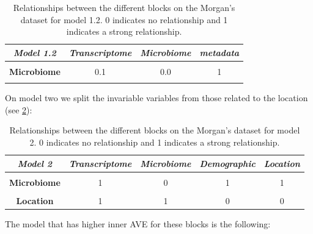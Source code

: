 \documentclass[
  12pt,
  a4paper,
  twoside,
  openright]{book}
\begin{document}
\begin{table}[H]

\caption[Model 1.2 of Morgan's dataset.]{\label{tab:morgan-model1-2}Relationships between the different blocks on the Morgan's dataset for model 1.2. 0 indicates no relationship and 1 indicates a strong relationship.}
\centering
\begin{tabular}[t]{|>{}c|c|c|>{}c|}
\hline
\em{\textbf{Model 1.2}} & \em{\textbf{Transcriptome}} & \em{\textbf{Microbiome}} & \em{\textbf{metadata}}\\
\hline
\textbf{\cellcolor{gray!6}{Transcriptome}} & \cellcolor{gray!6}{0.0} & \cellcolor{gray!6}{0.1} & \cellcolor{gray!6}{0}\\
\hline
\textbf{Microbiome} & 0.1 & 0.0 & 1\\
\hline
\textbf{\cellcolor{gray!6}{metadata}} & \cellcolor{gray!6}{0.0} & \cellcolor{gray!6}{1.0} & \cellcolor{gray!6}{0}\\
\hline
\end{tabular}
\end{table}

On model two we split the invariable variables from those related to the location (see \ref{tab:morgan-model2}):

\begin{table}[H]

\caption[Model 2 of Morgan's dataset.]{\label{tab:morgan-model2}Relationships between the different blocks on the Morgan's dataset for model 2. 0 indicates no relationship and 1 indicates a strong relationship.}
\centering
\begin{tabular}[t]{|>{}c|c|c|c|>{}c|}
\hline
\em{\textbf{Model 2}} & \em{\textbf{Transcriptome}} & \em{\textbf{Microbiome}} & \em{\textbf{Demographic}} & \em{\textbf{Location}}\\
\hline
\textbf{\cellcolor{gray!6}{Transcriptome}} & \cellcolor{gray!6}{0} & \cellcolor{gray!6}{1} & \cellcolor{gray!6}{1} & \cellcolor{gray!6}{1}\\
\hline
\textbf{Microbiome} & 1 & 0 & 1 & 1\\
\hline
\textbf{\cellcolor{gray!6}{Demographic}} & \cellcolor{gray!6}{1} & \cellcolor{gray!6}{1} & \cellcolor{gray!6}{0} & \cellcolor{gray!6}{0}\\
\hline
\textbf{Location} & 1 & 1 & 0 & 0\\
\hline
\end{tabular}
\end{table}

The model that has higher inner AVE for these blocks is the following:
\end{document}

